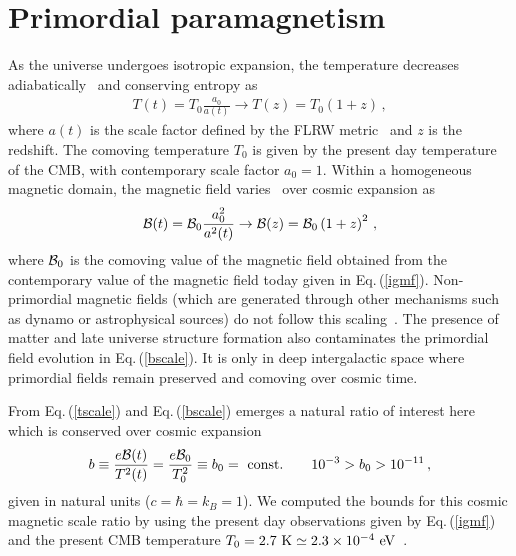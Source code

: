 \documentclass[reprint]{revtex4-2}
\newcommand*{\eV}{\text{ eV}}
\newcommand{\req}[1]{Eq.\,(\ref{#1})}
\newcommand*{\xblue}{\color{black}}
\begin{document}
\section{Primordial paramagnetism }
\label{sec:fugacity}
\noindent
As the universe undergoes isotropic expansion, the temperature decreases {\xblue adiabatically~\cite{abdalla2022cosmology} and conserving entropy} as 
\begin{align}
    \label{tscale}
    T(t)=T_{0}\frac{a_{0}}{a(t)}\rightarrow T(z)=T_{0}(1+z)\,,
\end{align}
where $a(t)$ is the scale factor defined by the FLRW metric~\cite{weinberg1972gravitation} and $z$ is the redshift. The comoving temperature $T_{0}$ is given by the present day temperature of the CMB, with contemporary scale factor $a_{0}=1$. Within a homogeneous magnetic domain, the magnetic field varies~\cite{durrer2013cosmological} over cosmic expansion as
\begin{align}
    \label{bscale}
    {\cal B}(t)={\cal B}_{0}\frac{a_{0}^{2}}{a^{2}(t)}\rightarrow{\cal B}(z)={\cal B}_{0}\left(1+z\right)^{2}\,,
\end{align}
where ${\cal B}_{0}$ is the comoving value of the magnetic field obtained from the contemporary value of the magnetic field today  given in \req{igmf}. Non-primordial magnetic fields (which are generated through other mechanisms  such as dynamo or astrophysical sources) do not follow this scaling~\cite{pomakov2022redshift}. The presence of matter and late universe structure formation also  contaminates the primordial field evolution in \req{bscale}. It is only in deep intergalactic space where primordial fields remain preserved and comoving over cosmic time.

From \req{tscale} and \req{bscale} emerges a natural ratio of interest here which is conserved over cosmic expansion 
\begin{align}
    \label{tbscale}
    b \equiv\frac{e{\cal B}(t)}{T^{2}(t)}=\frac{e{\cal B}_{0}}{T_{0}^{2}}\equiv b_0={\rm\ const.}\qquad10^{-3}>b_{0}>10^{-11}\,,
\end{align}
given in natural units ($c=\hbar=k_{B}=1$). We computed the bounds for this cosmic magnetic scale ratio by using the present day observations given by \req{igmf} and the present CMB temperature $T_{0}=2.7{\rm\ K}\simeq2.3\times10^{-4}\eV$~\cite{aghanim2018planck}.
\end{document}

